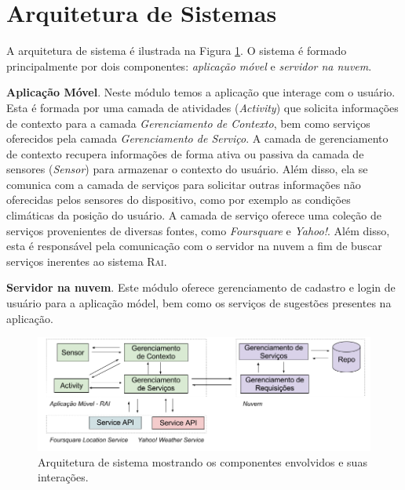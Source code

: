 \documentclass[11pt,a4paper,oneside]{article}
\begin{document}
\section{Arquitetura de Sistemas}
A arquitetura de sistema é ilustrada na Figura \ref{fig:arquitetura-rai}. O sistema é formado principalmente por dois componentes: \emph{aplicação móvel} e \emph{servidor na nuvem}.

\begin{description}
\item \textbf{Aplicação Móvel}. Neste módulo temos a aplicação que interage com o usuário. Esta é formada por uma camada de atividades (\emph{Activity}) que solicita informações de contexto para a camada \emph{Gerenciamento de Contexto}, bem como serviços oferecidos pela camada \emph{Gerenciamento de Serviço}. A camada de gerenciamento de contexto recupera informações de forma ativa ou passiva da camada de sensores (\emph{Sensor}) para armazenar o contexto do usuário. Além disso, ela se comunica com a camada de serviços para solicitar outras informações não oferecidas pelos sensores do dispositivo, como por exemplo as condições climáticas da posição do usuário. A camada de serviço oferece uma coleção de serviços provenientes de diversas fontes, como \emph{Foursquare} e \emph{Yahoo!}. Além disso, esta é responsável pela comunicação com o servidor na nuvem a fim de buscar serviços inerentes ao sistema \textsc{Rai}.

\item \textbf{Servidor na nuvem}. Este módulo oferece gerenciamento de cadastro e login de usuário para a aplicação módel, bem como os serviços de sugestões presentes na aplicação.
\end{description}

\begin{figure}[htb]
	\centering
	\includegraphics[width=\textwidth]{../figuras/arquitetura-rai.png}
	\caption{Arquitetura de sistema mostrando os componentes envolvidos e suas interações.}
	\label{fig:arquitetura-rai}
\end{figure}
\end{document}
